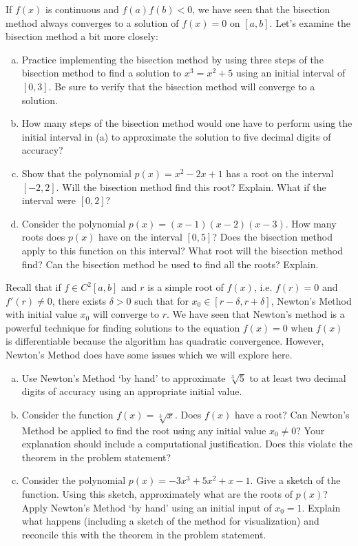\documentclass[11pt,letterpaper]{article}
\begin{document}
 If $f(x)$ is continuous and $f(a)f(b) < 0$, we have seen that the bisection method always converges to a solution of $f(x)= 0$ on $[a, b]$. Let's examine the bisection method a bit more closely:
	\begin{enumerate}[(a)]
	\item Practice implementing the bisection method by using three steps of the bisection method to find a solution to $x^3= x^2 + 5$ using an initial interval of $[0, 3]$. Be sure to verify that the bisection method will converge to a solution.
	\item How many steps of the bisection method would one have to perform using the initial interval in (a) to approximate the solution to five decimal digits of accuracy?
	\item Show that the polynomial $p(x)= x^2 - 2x + 1$ has a root on the interval $[-2, 2]$. Will the bisection method find this root? Explain. What if the interval were $[0, 2]$?
	\item Consider the polynomial $p(x)= (x - 1)(x - 2)(x - 3)$. How many roots does $p(x)$ have on the interval $[0, 5]$? Does the bisection method apply to this function on this interval? What root will the bisection method find? Can the bisection method be used to find all the roots? Explain. 
	\end{enumerate}



\newpage



 Recall that if $f \in C^2[a, b]$ and $r$ is a simple root of $f(x)$, i.e. $f(r)= 0$ and $f'(r) \neq 0$, there exists $\delta > 0$ such that for $x_0 \in [r - \delta, r + \delta]$, Newton's Method with initial value $x_0$ will converge to $r$. We have seen that Newton's method is a powerful technique for finding solutions to the equation $f(x)= 0$ when $f(x)$ is differentiable because the algorithm has quadratic convergence. However, Newton's Method does have some issues which we will explore here.
	\begin{enumerate}[(a)]
	\item Use Newton's Method `by hand' to approximate $\sqrt[3]{5}$ to at least two decimal digits of accuracy using an appropriate initial value. 
	\item Consider the function $f(x)= \sqrt[3]{x}$. Does $f(x)$ have a root? Can Newton's Method be applied to find the root using any initial value $x_0 \neq 0$? Your explanation should include a computational justification. Does this violate the theorem in the problem statement? 
	\item Consider the polynomial $p(x)= -3x^3 + 5x^2 + x - 1$. Give a sketch of the function.  Using this sketch, approximately what are the roots of $p(x)$? Apply Newton's Method `by hand' using an initial input of $x_0= 1$. Explain what happens (including a sketch of the method for visualization) and reconcile this with the theorem in the problem statement. 
	\end{enumerate}
\end{document}
